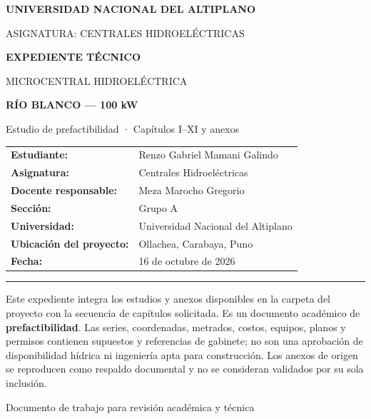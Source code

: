 \documentclass[11pt,a4paper]{article}
\begin{document}
\thispagestyle{empty}

\begin{tcolorbox}[colback=DarkBlue,colframe=DarkBlue,arc=3mm,boxrule=0pt,top=7mm,bottom=7mm,left=5mm,right=5mm]
\color{white}\centering
{\Large\bfseries UNIVERSIDAD NACIONAL DEL ALTIPLANO}\par\vspace{2mm}
{\large ASIGNATURA: CENTRALES HIDROELÉCTRICAS}\par\vspace{8mm}
{\Huge\bfseries EXPEDIENTE TÉCNICO}\par\vspace{2mm}
{\LARGE MICROCENTRAL HIDROELÉCTRICA}\par
{\LARGE\bfseries RÍO BLANCO — 100 kW}\par\vspace{4mm}
{\large Estudio de prefactibilidad · Capítulos I–XI y anexos}\par
\end{tcolorbox}
\vspace{3mm}
\begin{tabularx}{\textwidth}{>{\bfseries}p{4.8cm}Y}
Estudiante: & Renzo Gabriel Mamani Galindo\\
Asignatura: & Centrales Hidroeléctricas\\
Docente responsable: & Meza Marocho Gregorio\\
Sección: & Grupo A\\
Universidad: & Universidad Nacional del Altiplano\\
Ubicación del proyecto: & Ollachea, Carabaya, Puno\\
Fecha: & 16 de octubre de 2026\\
\end{tabularx}
\vspace{3mm}\hrule\vspace{4mm}
\begin{resumenbox}[title=Estado y alcance]
Este expediente integra los estudios y anexos disponibles en la carpeta del proyecto con la secuencia de capítulos solicitada. Es un documento académico de \textbf{prefactibilidad}. Las series, coordenadas, metrados, costos, equipos, planos y permisos contienen supuestos y referencias de gabinete; no son una aprobación de disponibilidad hídrica ni ingeniería apta para construcción. Los anexos de origen se reproducen como respaldo documental y no se consideran validados por su sola inclusión.
\end{resumenbox}
\vfill
\begin{center}\small\color{MidGrey}Documento de trabajo para revisión académica y técnica\end{center}
\clearpage
\end{document}
